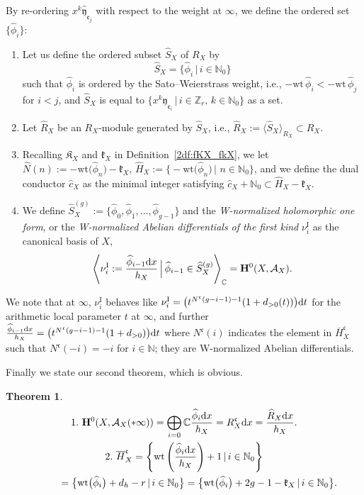 \documentclass[pdftex]{sigma}
\def\CC{{\mathbb C}}
\def\ZZ{{\mathbb Z}}
\def\NN{{\mathbb N}}
\def\bH{{\mathbf F}}
\def\bH{{\mathbf H}}
\def\cA{{\mathcal A}}
\def\fK{{\mathfrak K}}
\def\fc{{\mathfrak c}}
\def\fe{{\mathfrak e}}
\def\fk{{\mathfrak k}}
\def\BH{{\overline H}}
\def\hc{{\widehat c}}
\def\hH{{\widehat H}}
\def\hN{{\widehat N}}
\def\hR{{\widehat R}}
\def\hS{{\widehat S}}
\def\hfy{{\widehat{\mathfrak y}}}
\def\hphi{{\widehat \phi}}
\def\wt{{\mathrm {wt}}}
\def\nuI#1{{\nu^{\mathrm{I}}_{#1}}}
\numberwithin{equation}{section}
\newtheorem{Theorem}{Theorem}[section]
\begin{document}
By re-ordering $x^k\hfy_{\fe_j}$ with respect to the weight at $\infty$, we define the ordered set $\big\{\hphi_i\big\}$:

\begin{Definition}\label{2df:nuI_hX}\quad
\begin{enumerate}\itemsep=0pt
\item
Let us define the ordered subset
$\hS_X$ of $R_X$ by
\[
\hS_X=\big\{\hphi_i\, | \, i \in \NN_0\big\}
\]
such that $\hphi_i$ is ordered by the Sato--Weierstrass weight,
i.e., $-\wt \,\hphi_i < -\wt\, \hphi_j$ for $i < j$,
and
$\hS_X$ is equal to $\big\{x ^k \hfy_{\fe_i} \, |\,i \in \ZZ_r,\, k \in \NN_0\big\}$ as a set.

\item Let $\hR_X$ be an $R_X$-module generated by $\hS_X$, i.e., $\hR_X:=\langle \hS_X\rangle_{R_X} \subset R_X$.

\item Recalling $\fK_X$ and $\fk_X$ in Definition~\ref{2df:fKX_fkX}, we let $\hN(n):= -\wt \big(\hphi_n\big)-\fk_X$, $\hH_X:=\big\{{-}\wt \big(\hphi_n\big)\, |$ $n \in \NN_0\big\}$, and we define the dual conductor $\hc_X$ as the minimal integer satisfying $\hc_X + \NN_0 \subset \hH_X-\fk_X$.

\item We define $\hS_X^{(g)}:=\big\{\hphi_0, \hphi_1, \dots, \hphi_{g-1}\big\}$ and the \emph{W-normalized holomorphic one form}, or the \emph{W-normalized Abelian differentials of the first kind} $\nuI{i}$ as the canonical basis of $X$,
\begin{equation}
\left\langle\nuI{i} := \frac{\hphi_{i-1} {\rm d} x }{h_X}\,\Bigr|\,
\hphi_{i-1} \in \hS_X^{(g)}\right\rangle_\CC = \bH^0(X, \cA_X).\label{2eq:nuI_hX}
\end{equation}
\end{enumerate}
\end{Definition}

We note that at $\infty$, $\nuI{i}$ behaves like
$
\nuI{i}=\big(t^{N^\fc(g-i-1)-1} (1+ d_{>0}(t))\big) {\rm d} t$ for the arithmetic local parameter $t$ at $\infty$, and further
$\frac{\hphi_{i-1} {\rm d} x }{h_X}=
\big(t^{N^\fc(g-i-1)-1}(1+d_{>0})\big){\rm d}t$ where $N^\fc(i)$ indicates the element in $\BH_X^\fc$ such that $N^\fc(-i)=-i$ for $i \in \NN$; they are W-normalized Abelian differentials.

Finally we state our second theorem, which is obvious.

\begin{Theorem}\label{2lm:nuI_hX}\quad
\begin{gather*}
1. \ \bH^0(X, \cA_X(*\infty)) = \bigoplus_{i=0} \CC\frac{\hphi_i {\rm d} x}{h_X}=R_X^\fc {\rm d} x = \frac{\hR_X {\rm d} x}{h_X}.\\
2. \
{\overline H}_X^{\mathfrak c}=\left\{ \wt\left(\frac{\hphi_i {\rm d} x}{h_X}\right)+1 \, |\,i \in \NN_0\right\}
\\
\hphantom{2. \ {\overline H}_X^{\mathfrak c}}{}
 =\big\{ \wt\big(\hphi_i\big)+d_h -r \, |\,i \in \NN_0\big\} =\big\{ \wt\big(\hphi_i\big)+2g-1 -\fk_X \, |\,i \in \NN_0\big\}.
\end{gather*}
\end{Theorem}
\end{document}
